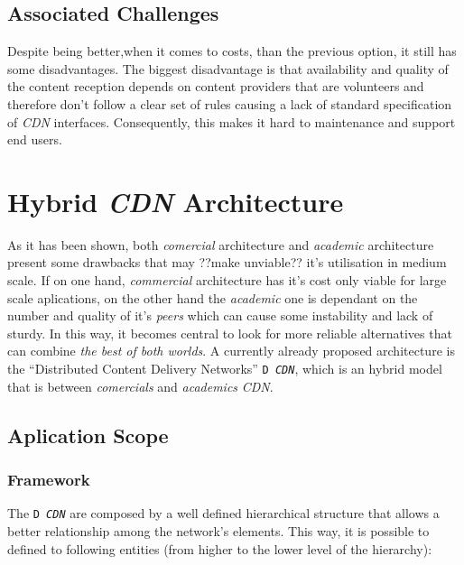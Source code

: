 \documentclass{llncs}
\begin{document}
\subsection{Associated Challenges}
Despite being better,when it comes to costs,
than the previous option, it still has some disadvantages.
The biggest disadvantage is that availability and quality of the content
reception depends on content providers that are volunteers and therefore don't
follow a clear set of rules causing a lack of standard specification of
\textit{CDN} interfaces.
Consequently, this makes it hard to maintenance and support end users.






\section{Hybrid \textit{CDN} Architecture}					%

As it has been shown, both \emph{comercial} architecture and 
\emph{academic} architecture present some drawbacks that may 
??make unviable?? it's utilisation in medium scale. If on one hand,
\emph{commercial} architecture has it's cost only viable for 
large scale aplications, on the other hand the \emph{academic}
one is dependant on the number and quality of it's \emph{peers}
which can cause some instability and lack of sturdy.
In this way, it becomes central to look for more reliable alternatives
that can combine \emph{the best of both worlds}. A currently already
proposed architecture is the ``Distributed Content Delivery Networks''
\texttt{D \textit{CDN}}, which is an hybrid model that is between 
\emph{comercials} and \emph{academics} \textit{CDN}.




\subsection{Aplication Scope}

\subsubsection{Framework}
The \texttt{D \textit{CDN}} are composed by a well defined hierarchical structure
that allows a better relationship among the network's elements.
This way, it is possible to defined to following entities (from higher
to the lower level of the hierarchy):
\end{document}
